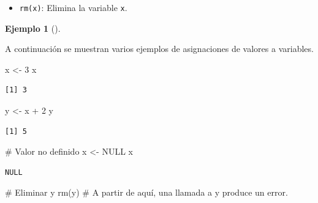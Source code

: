 \documentclass[
  a4paper,
]{scrreport}
\newenvironment{Shaded}{\begin{snugshade}}{\end{snugshade}}
\newcommand{\CommentTok}[1]{\textcolor[rgb]{0.37,0.37,0.37}{#1}}
\newcommand{\ConstantTok}[1]{\textcolor[rgb]{0.56,0.35,0.01}{#1}}
\newcommand{\DecValTok}[1]{\textcolor[rgb]{0.68,0.00,0.00}{#1}}
\newcommand{\FunctionTok}[1]{\textcolor[rgb]{0.28,0.35,0.67}{#1}}
\newcommand{\NormalTok}[1]{\textcolor[rgb]{0.00,0.23,0.31}{#1}}
\newcommand{\OtherTok}[1]{\textcolor[rgb]{0.00,0.23,0.31}{#1}}
\newcommand{\SpecialCharTok}[1]{\textcolor[rgb]{0.37,0.37,0.37}{#1}}
\providecommand{\tightlist}{%
  \setlength{\itemsep}{0pt}\setlength{\parskip}{0pt}}\usepackage{longtable,booktabs,array}
\theoremstyle{definition}
\newtheorem{example}{Ejemplo}[chapter]
\theoremstyle{definition}
\theoremstyle{remark}
\begin{document}
\begin{itemize}
\tightlist
\item
  \texttt{rm(x)}: Elimina la variable \texttt{x}.
\end{itemize}

\leavevmode{}%
\begin{example}[]\label{exm-variables}

A continuación se muestran varios ejemplos de asignaciones de valores a
variables.

\begin{Shaded}
\begin{Highlighting}[]
\NormalTok{x }\OtherTok{\textless{}{-}} \DecValTok{3}
\NormalTok{x}
\end{Highlighting}
\end{Shaded}

\begin{verbatim}
[1] 3
\end{verbatim}

\begin{Shaded}
\begin{Highlighting}[]
\NormalTok{y }\OtherTok{\textless{}{-}}\NormalTok{ x }\SpecialCharTok{+} \DecValTok{2}
\NormalTok{y}
\end{Highlighting}
\end{Shaded}

\begin{verbatim}
[1] 5
\end{verbatim}

\begin{Shaded}
\begin{Highlighting}[]
\CommentTok{\# Valor no definido}
\NormalTok{x }\OtherTok{\textless{}{-}} \ConstantTok{NULL}
\NormalTok{x}
\end{Highlighting}
\end{Shaded}

\begin{verbatim}
NULL
\end{verbatim}

\begin{Shaded}
\begin{Highlighting}[]
\CommentTok{\# Eliminar y}
\FunctionTok{rm}\NormalTok{(y)}
\CommentTok{\# A partir de aquí, una llamada a y produce un error.}
\end{Highlighting}
\end{Shaded}

\end{example}
\end{document}
